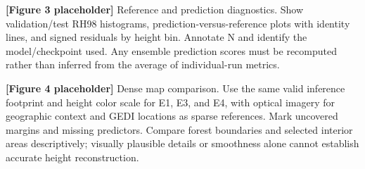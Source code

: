 \textbf{[Figure 3 placeholder]} Reference and prediction diagnostics. Show validation/test RH98 histograms, prediction-versus-reference plots with identity lines, and signed residuals by height bin. Annotate N and identify the model/checkpoint used. Any ensemble prediction scores must be recomputed rather than inferred from the average of individual-run metrics.

\textbf{[Figure 4 placeholder]} Dense map comparison. Use the same valid inference footprint and height color scale for E1, E3, and E4, with optical imagery for geographic context and GEDI locations as sparse references. Mark uncovered margins and missing predictors. Compare forest boundaries and selected interior areas descriptively; visually plausible details or smoothness alone cannot establish accurate height reconstruction.
